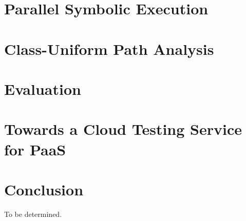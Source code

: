 \documentclass[letterpaper,12pt]{book}
\begin{document}
\chapter{Parallel Symbolic Execution}




\chapter{Class-Uniform Path Analysis}




\chapter{Evaluation}



\chapter{Towards a Cloud Testing Service for PaaS}




\chapter{Conclusion}

To be determined.



\end{document}
